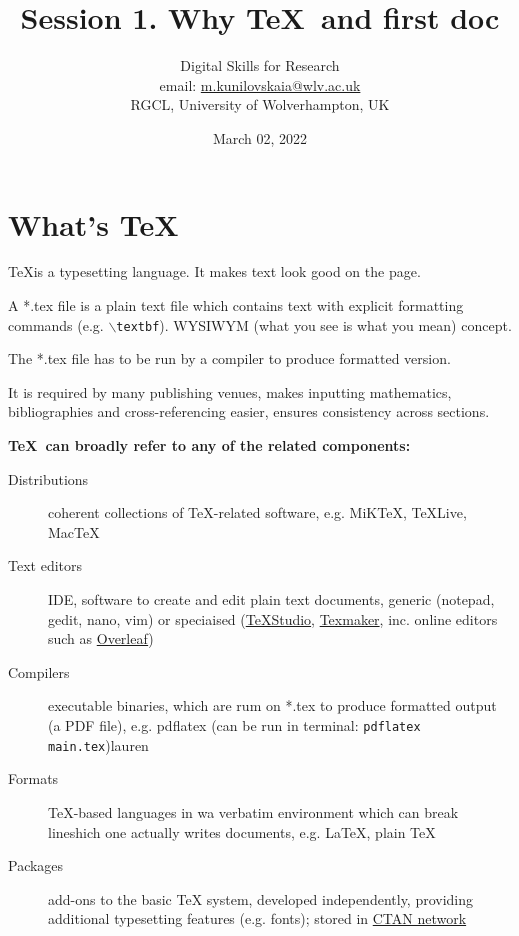 \documentclass[a4paper,11pt]{article}  %
\title{Session 1. Why \TeX~and first doc}
\author{Digital Skills for Research \\ 
	email: \href{m.kunilovskaia@wlv.ac.uk}{m.kunilovskaia@wlv.ac.uk} \\ 
	RGCL, University of Wolverhampton, UK}
\date{March 02, 2022}
\begin{document}
\maketitle

\tableofcontents


\section{What's \TeX}
\begin{tcolorbox}[width=\textwidth,colback={yellow!50!white}]
	\TeX is a typesetting language. It makes text look good on the page. 
	\medskip
	
	A *.tex file is a plain text file which contains text with explicit formatting commands (e.g. \texttt{$\backslash$textbf}). WYSIWYM (what you see is what you mean) concept.
	
	The *.tex file has to be run by a compiler to produce formatted version.
	\medskip
	
	It is required by many publishing venues, makes inputting mathematics, bibliographies and cross-referencing easier, ensures consistency across sections.
	
\end{tcolorbox}   

\vspace{1em}

\textbf{\Large{\TeX~can broadly refer to any of the related components:}}

\begin{description}
	\item[Distributions] coherent collections of TeX-related software, e.g. MiKTeX, TeXLive, MacTeX
	\item[Text editors] IDE, software to create and edit plain text documents, generic (notepad, gedit, nano, vim) or speciaised (\href{http://texstudio.sourceforge.net/}{TeXStudio}, \href{https://www.xm1math.net/texmaker/}{Texmaker}, inc. online editors such as \href{https://www.overleaf.com}{Overleaf})
	\item[Compilers] executable binaries, which are rum on *.tex to produce formatted output (a PDF file), e.g. pdflatex (can be run in terminal: \texttt{pdflatex main.tex})lauren
	\item[Formats] TeX-based languages in wa verbatim environment which can break lineshich one actually writes documents, e.g. LaTeX, plain TeX
	\item[Packages] add-ons to the basic TeX system, developed independently, providing additional typesetting features (e.g. fonts); stored in \href{https://ctan.org/}{CTAN network}
\end{description}
\end{document}
